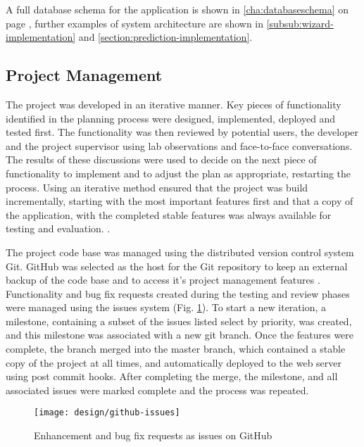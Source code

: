 A full database schema for the application is shown in \autoref{cha:databaseschema} on page \pageref{cha:databaseschema}, further examples of system architecture are shown in \autoref{subsub:wizard-implementation} and \autoref{section:prediction-implementation}.

\subsection{Project Management}
The project was developed in an iterative manner. Key pieces of functionality identified in the planning process were designed, implemented, deployed and tested first. The functionality was then reviewed by potential users, the developer and the project supervisor using lab observations and face-to-face conversations. The results of these discussions were used to decide on the next piece of functionality to implement and to adjust the plan as appropriate, restarting the process. Using an iterative method ensured that the project was build incrementally, starting with the most important features first and that a copy of the application, with the completed stable features was always available for testing and evaluation. .

The project code base was managed using the distributed version control system Git.  GitHub was selected as the host for the Git repository to keep an external backup of the code base and to access it's project management features \parencite{github2014github}.
%
Functionality and bug fix requests created during the testing and review phases were managed using the issues system (Fig.  \ref{fig:github-issues}). To start a new iteration, a milestone, containing a subset of the issues listed select by priority, was created, and this milestone was associated with a new git branch. Once the features were complete, the branch merged into the master branch, which contained a stable copy of the project at all times, and automatically deployed to the web server using post commit hooks. After completing the merge, the milestone, and all associated issues were marked complete and the process was repeated.

\begin{figure}[h]
    \centering
    \texttt{[image: design/github-issues]}
    \caption{Enhancement and bug fix requests as issues on GitHub}
    \label{fig:github-issues}
\end{figure}
